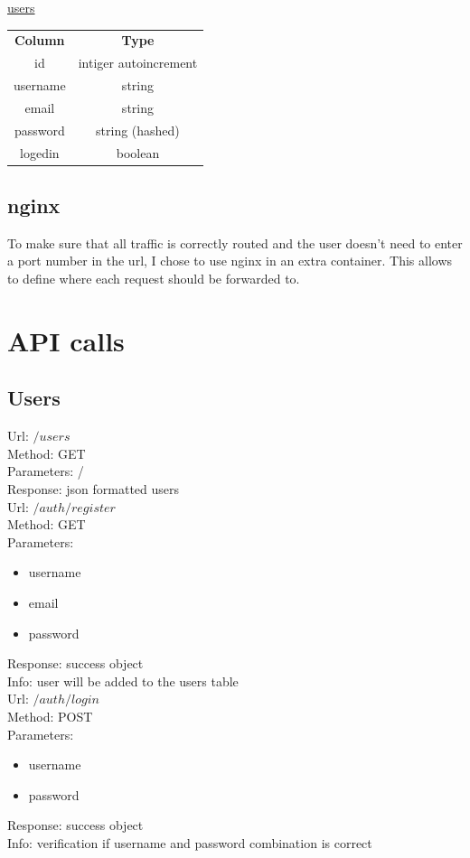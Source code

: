 \documentclass[12pt,a4paper]{article}
\begin{document}
\begin{center}
\underline{users}\\
\begin{tabular}{c|c}
\textbf{Column} & \textbf{Type}\\
id & intiger autoincrement\\\hline
username & string\\\hline
email & string\\\hline
password & string (hashed)\\\hline
logedin & boolean
\end{tabular}
\end{center}

\subsection{nginx}
To make sure that all traffic is correctly routed and the user doesn't need to enter a port number in the url, I chose to use nginx in an extra container. This allows to define where each request should be forwarded to.

\pagebreak
\section{API calls}
\subsection{Users}
Url: $/users$\\
Method: GET\\
Parameters: /\\
Response: json formatted users\\

Url: $/auth/register$\\
Method: GET\\
Parameters: 
\begin{itemize}
\item username
\item email
\item password
\end{itemize}
Response: success object\\
Info: user will be added to the users table\\

Url: $/auth/login$\\
Method: POST\\
Parameters: 
\begin{itemize}
\item username
\item password
\end{itemize}
Response: success object\\
Info: verification if username and password combination is correct\\
\end{document}
